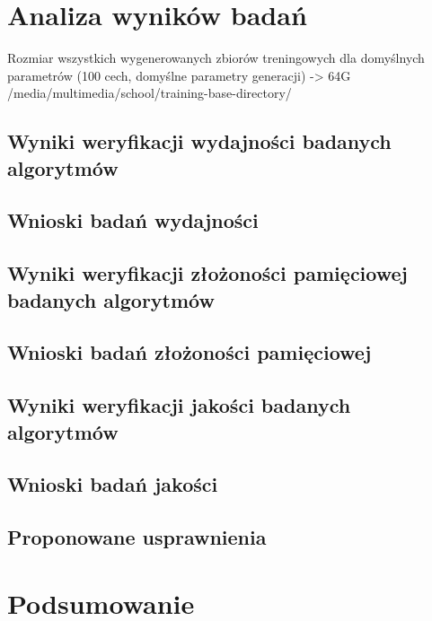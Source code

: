 \chapter{Analiza wyników badań}\label{Chapter_AnalizaRezultatow}

  Rozmiar wszystkich wygenerowanych zbiorów treningowych dla domyślnych parametrów (100 cech, domyślne parametry generacji) -> 64G /media/multimedia/school/training-base-directory/

  \section{Wyniki weryfikacji wydajności badanych algorytmów}\label{Section_Performance}

  \section{Wnioski badań wydajności}\label{Section_PerformanceWnioski}

  \section{Wyniki weryfikacji złożoności pamięciowej badanych algorytmów}\label{Section_MemoryPerformance}

  \section{Wnioski badań złożoności pamięciowej}\label{Section_MemoryPerformanceWnioski}

  \section{Wyniki weryfikacji jakości badanych algorytmów}\label{Section_Quality}

  \section{Wnioski badań jakości}\label{Section_QualityWnioski}

  \section{Proponowane usprawnienia}\label{Section_Usprawnienia}


\chapter{Podsumowanie}\label{Section_Podsumowanie}